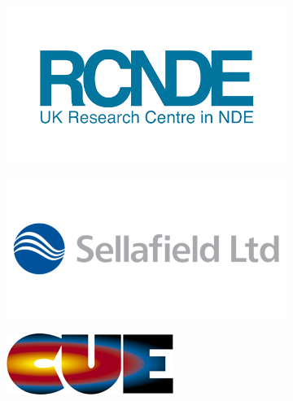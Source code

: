 \documentclass[a4paper,twoside,11pt]{article}
\begin{document}
\begin{titlepage}
\begin{figure}[H]
	\begin{subfigure}[m]{0.3\textwidth}
		\centering
		\includegraphics[width=\textwidth]{RCNDE}
		\label{fig:RCNDE}
	\end{subfigure}
	\quad
	\begin{subfigure}[m]{0.3\textwidth}
		\centering
		\includegraphics[width=\textwidth]{Sellafield}
		\label{fig:Sellafield}
	\end{subfigure}
	\quad
\begin{subfigure}[m]{0.3\textwidth}
	\centering
	\includegraphics[width=\textwidth]{CUE_logo}
	\label{fig:Sellafield}
\end{subfigure}
	\label{fig:Logo}
\end{figure}
		
\end{titlepage}\
\end{document}
